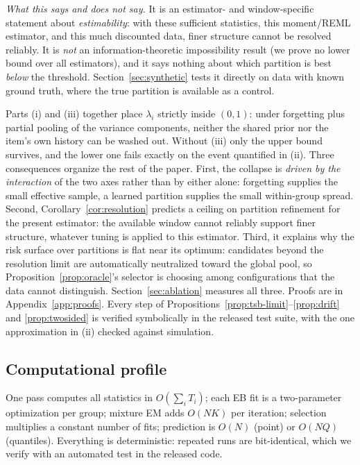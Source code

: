 \documentclass[twocolumn,10pt]{article}
\begin{document}
\emph{What this says and does not say.} It is an estimator- and
window-specific statement about \emph{estimability}: with these
sufficient statistics, this moment/REML estimator, and this much
discounted data, finer structure cannot be resolved reliably. It is
\emph{not} an information-theoretic impossibility result (we prove no
lower bound over all estimators), and it says nothing about which
partition is best \emph{below} the threshold. Section~\ref{sec:synthetic}
tests it directly on data with known ground truth, where the true
partition is available as a control.

Parts (i) and (iii) together place $\lambda_i$ strictly inside $(0,1)$:
under forgetting plus partial pooling of the variance components,
neither the shared prior nor the item's own history can be washed out.
Without (iii) only the upper bound survives, and the lower one fails
exactly on the event quantified in (ii). Three consequences organize the
rest of the paper. First, the collapse is \emph{driven by the
interaction} of the two axes rather than by either alone: forgetting
supplies the small effective sample, a learned partition supplies the
small within-group spread. Second,
Corollary~\ref{cor:resolution} predicts a ceiling on partition refinement
for the present estimator: the available window cannot reliably support
finer structure, whatever tuning is applied to this estimator. Third, it explains why the risk surface over
partitions is flat near its optimum: candidates beyond the resolution
limit are automatically neutralized toward the global pool, so
Proposition~\ref{prop:oracle}'s selector is choosing among configurations
that the data cannot distinguish. Section~\ref{sec:ablation} measures all
three. Proofs are in Appendix~\ref{app:proofs}. Every step of
Propositions~\ref{prop:tsb-limit}--\ref{prop:drift} and
\ref{prop:twosided} is verified symbolically in the released test suite,
with the one approximation in (ii) checked against simulation.

\subsection{Computational profile}\label{sec:complexity}
One pass computes all statistics in $O(\sum_i T_i)$; each EB fit is a
two-parameter optimization per group; mixture EM adds $O(NK)$ per
iteration; selection multiplies a constant number of fits; prediction is
$O(N)$ (point) or $O(NQ)$ (quantiles). Everything is
deterministic: repeated runs are bit-identical, which we verify with an
automated test in the released code.
\end{document}
